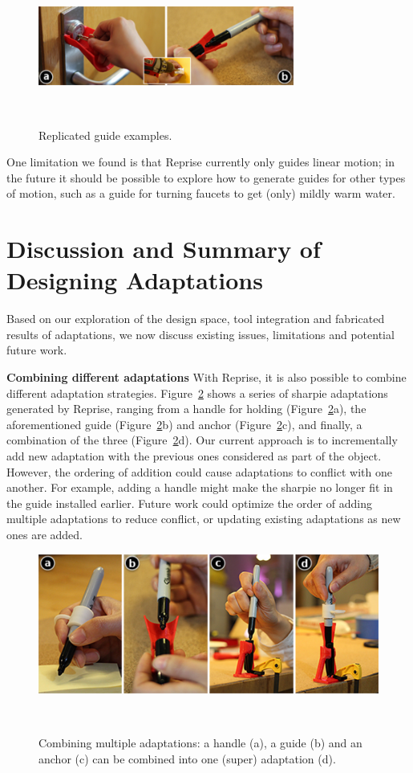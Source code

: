 \begin{figure}[h!]
  \vskip 5pt
  \centering
  \includegraphics[width=0.75\textwidth]{figures/reprise_guide_results_v1.pdf}
  \caption{Replicated guide examples.}~\label{fig:reprise_guide_results}
\end{figure}

One limitation we found is that Reprise currently only guides linear motion; in the future it should be possible to explore how to generate guides for other types of motion, such as a guide for turning faucets to get (only) mildly warm water.


\section{Discussion and Summary of Designing Adaptations}
Based on our exploration of the design space, tool integration and fabricated results of adaptations, we now discuss existing issues, limitations and potential future work.

\textbf{Combining different adaptations}
With Reprise, it is also possible to combine different adaptation strategies. Figure~\ref{fig:reprise_combine_adaptations} shows a series of sharpie adaptations generated by Reprise, ranging from a handle for holding (Figure~\ref{fig:reprise_combine_adaptations}a), the aforementioned guide (Figure~\ref{fig:reprise_combine_adaptations}b) and anchor (Figure~\ref{fig:reprise_combine_adaptations}c), and finally, a combination of the three (Figure~\ref{fig:reprise_combine_adaptations}d). Our current approach is to incrementally add new adaptation with the previous ones considered as part of the object. However, the ordering of addition could cause adaptations to conflict with one another. For example, adding a handle might make the sharpie no longer fit in the guide installed earlier. Future work could optimize the order of adding multiple adaptations to reduce conflict, or updating existing adaptations as new ones are added.

\begin{figure}[h!]
  \centering
  \includegraphics[width=1\textwidth]{figures/reprise_combine_adaptations_v1.pdf}
  \caption{Combining multiple adaptations: a handle (a), a guide (b) and an anchor (c) can be combined into one (super) adaptation (d).}~\label{fig:reprise_combine_adaptations}
\end{figure}


